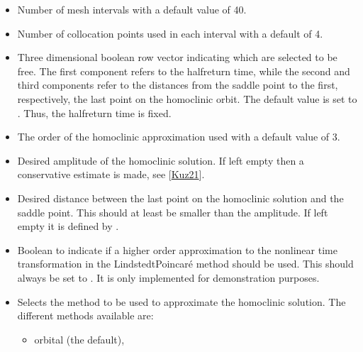 \documentclass[letterpaper,10pt,english]{jupyterBook}
\begin{document}
\begin{itemize}
\item {} 
\sphinxAtStartPar
{} Number of mesh intervals with a default value of 40.

\item {} 
\sphinxAtStartPar
{} Number of collocation points used in each interval with a default of 4.

\item {} 
\sphinxAtStartPar
{} Three dimensional boolean row vector indicating which  are selected to be free. The first component refers to the
half\sphinxhyphen{}return time, while the second and third components refer to the
distances from the saddle point to the first, respectively, the last point on
the homoclinic orbit. The default value is set to \sphinxcode{\sphinxupquote{{[}0 1 1{]}}}. Thus, the
half\sphinxhyphen{}return time  is fixed.

\item {} 
\sphinxAtStartPar
{} The order of the homoclinic approximation used with a default value
of 3.

\item {} 
\sphinxAtStartPar
{} Desired amplitude of the homoclinic solution. If left empty then
a conservative estimate is made, see {[}\hyperlink{cite.references:id3}{Kuz21}{]}.

\item {} 
\sphinxAtStartPar
{} Desired distance between the last point on the homoclinic
solution and the saddle point. This should at least be smaller than the
amplitude. If left empty it is defined by .

\item {} 
\sphinxAtStartPar
{} Boolean to indicate if a higher order
approximation to the nonlinear time transformation in the Lindstedt\sphinxhyphen{}Poincaré
method should be used. This should always be set to .  It is only
implemented for demonstration purposes.

\item {} 
\sphinxAtStartPar
{} Selects the method to be used to approximate the homoclinic
solution. The different methods available are:
\begin{itemize}
\item {} 
\sphinxAtStartPar
orbital (the default),


\end{itemize}
\end{itemize}
\end{document}
